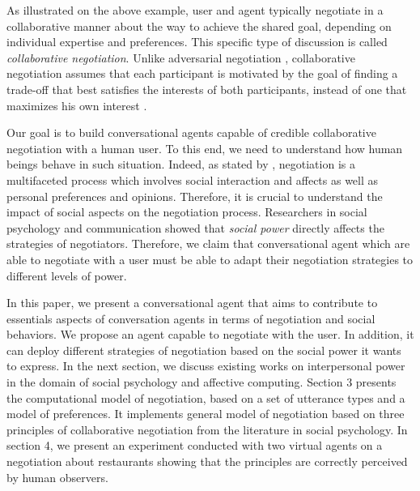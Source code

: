 \documentclass{llncs}
\begin{document}
		As illustrated on the above example, user  and agent typically negotiate in a collaborative manner about the way to achieve the shared goal, depending on individual expertise and preferences. This specific type of discussion is called \emph{collaborative negotiation}. Unlike adversarial negotiation \cite{broekens2010affective}, collaborative negotiation assumes that each participant is motivated by the goal of finding a trade-off that best satisfies the interests of both participants, instead of one that maximizes his own interest \cite{sidner1994artificial,chu1995response}.
		
		Our goal is to build conversational agents capable of credible collaborative negotiation with a human user. To this end, we need to understand how human beings behave in such situation. Indeed, as stated by \cite{broekens2010affective}, negotiation is a multifaceted process which involves social interaction and affects as well as personal preferences and opinions. Therefore, it is crucial to understand the impact of social aspects on the negotiation process. Researchers in social psychology and communication \cite{dunbar2005perceptions,de1995impact} showed that  \emph{social power} directly affects the strategies of negotiators. Therefore, we claim that conversational agent which are able to negotiate with a user must be able to adapt their negotiation strategies to different levels of power.
		
		In this paper, we present a conversational agent that aims to contribute to essentials aspects of conversation agents in terms of negotiation and social behaviors.
		We propose an agent capable to negotiate with the user. In addition, it can deploy different strategies of negotiation based on the social power it wants to express.
		 In the next section, we discuss existing works on interpersonal power in the domain of social psychology and affective computing. Section 3 presents the computational model of negotiation, based on a set of utterance types and a model of preferences. It implements general model of negotiation based on three principles of collaborative negotiation from the literature in social psychology. In section 4, we present an experiment conducted with two virtual agents on a negotiation about restaurants showing that the principles are correctly perceived by human observers.	
		
\end{document}
